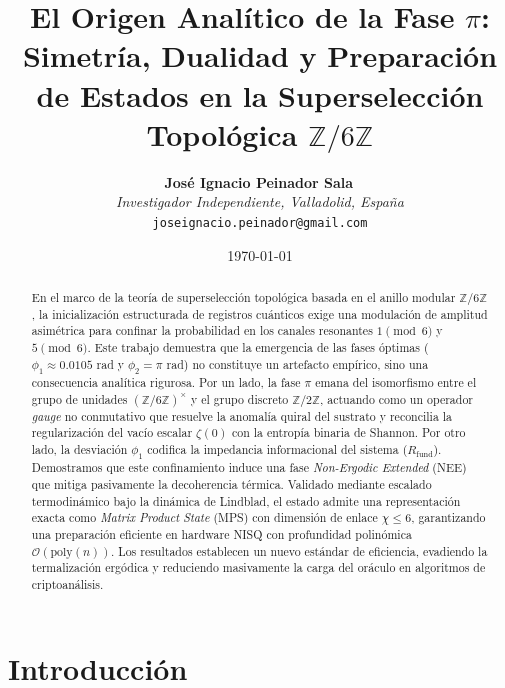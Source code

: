 \documentclass[12pt,a4paper]{article}
\theoremstyle{plain}
\theoremstyle{definition}
\theoremstyle{remark}
\begin{document}
\title{El Origen Analítico de la Fase $\pi$: Simetría, Dualidad y Preparación de Estados en la Superselección Topológica $\mathbb{Z}/6\mathbb{Z}$}

\author{
  \textbf{José Ignacio Peinador Sala}\, \\
  \textit{Investigador Independiente, Valladolid, España} \\
  \texttt{joseignacio.peinador@gmail.com}
}

\date{\today}
\maketitle

\begin{abstract}
En el marco de la teoría de superselección topológica basada en el anillo modular $\mathbb{Z}/6\mathbb{Z}$, la inicialización estructurada de registros cuánticos exige una modulación de amplitud asimétrica para confinar la probabilidad en los canales resonantes $1 \pmod 6$ y $5 \pmod 6$. Este trabajo demuestra que la emergencia de las fases óptimas ($\phi_1 \approx 0.0105$ rad y $\phi_2 = \pi$ rad) no constituye un artefacto empírico, sino una consecuencia analítica rigurosa. Por un lado, la fase $\pi$ emana del isomorfismo entre el grupo de unidades $(\mathbb{Z}/6\mathbb{Z})^{\times}$ y el grupo discreto $\mathbb{Z}/2\mathbb{Z}$, actuando como un operador \textit{gauge} no conmutativo que resuelve la anomalía quiral del sustrato y reconcilia la regularización del vacío escalar $\zeta(0)$ con la entropía binaria de Shannon. Por otro lado, la desviación $\phi_1$ codifica la impedancia informacional del sistema ($R_{\text{fund}}$). Demostramos que este confinamiento induce una fase \textit{Non-Ergodic Extended} (NEE) que mitiga pasivamente la decoherencia térmica. Validado mediante escalado termodinámico bajo la dinámica de Lindblad, el estado admite una representación exacta como \textit{Matrix Product State} (MPS) con dimensión de enlace $\chi \le 6$, garantizando una preparación eficiente en hardware NISQ con profundidad polinómica $\mathcal{O}(\text{poly}(n))$. Los resultados establecen un nuevo estándar de eficiencia, evadiendo la termalización ergódica y reduciendo masivamente la carga del oráculo en algoritmos de criptoanálisis.
\end{abstract}

\tableofcontents
\newpage

\section{Introducción}
\end{document}
